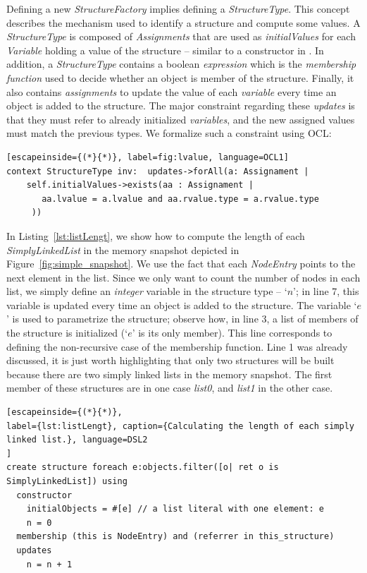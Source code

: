 Defining a new \textit{StructureFactory} implies defining a \textit{StructureType}.
This concept describes the mechanism used to identify a structure and compute some values.
A \textit{StructureType} is composed of \textit{Assignments} that are used as \textit{initialValues} for each \textit{Variable} holding a value of the structure -- similar to a constructor in .
In addition, a \textit{StructureType} contains a boolean \textit{expression} which is the \textit{membership function} used to decide whether an object is member of the structure.
Finally, it also contains \textit{assignments} to update the value of each \textit{variable} every time an object is added to the structure.
The major constraint regarding these \textit{updates} is that they must refer to already initialized \textit{variables}, and the new assigned values must match the previous types.
We formalize such a constraint using OCL:

\begin{lstlisting}[escapeinside={(*}{*)}, label=fig:lvalue, language=OCL1]
context StructureType inv:  updates->forAll(a: Assignament | 
    self.initialValues->exists(aa : Assignament | 
       aa.lvalue = a.lvalue and aa.rvalue.type = a.rvalue.type
     ))
\end{lstlisting}


In Listing~\ref{lst:listLengt}, we show how to compute the length of each \textit{SimplyLinkedList} in the memory snapshot depicted in Figure~\ref{fig:simple_snapshot}.
We use the fact that each \textit{NodeEntry} points to the next element in the list.
Since we only want to count the number of nodes in each list, we simply define an \textit{integer} variable in the structure type -- `$n$'; in line 7, this variable is updated every time an object is added to the structure.
The variable `$e$' is used to parametrize the structure; observe how, in line 3, a list of members of the structure is initialized (`$e$' is its only member).
This line corresponds to defining the non-recursive case of the membership function.
Line 1 was already discussed, it is just worth highlighting that only two structures will be built because there are two simply linked lists in the memory snapshot.
The first member of these structures are in one case \textit{list0}, and \textit{list1} in the other case.
 

\begin{lstlisting}[escapeinside={(*}{*)}, 
label={lst:listLengt}, caption={Calculating the length of each simply linked list.}, language=DSL2
]
create structure foreach e:objects.filter([o| ret o is SimplyLinkedList]) using
  constructor
    initialObjects = #[e] // a list literal with one element: e
    n = 0
  membership (this is NodeEntry) and (referrer in this_structure)
  updates 
    n = n + 1
\end{lstlisting}

